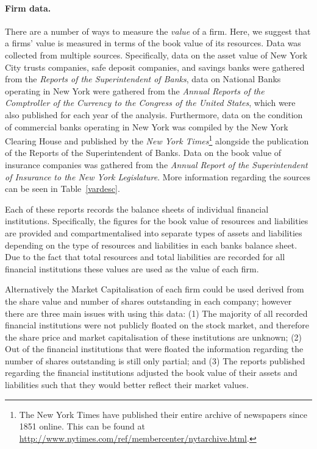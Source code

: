 \paragraph{Firm data.}

There are a number of ways to measure the \emph{value} of a firm. Here, we suggest that a firms' value is measured in terms of the book value of its resources. Data was collected from multiple sources. Specifically, data on the asset value of New York City trusts companies, safe deposit companies, and savings banks were gathered from the \emph{Reports of the Superintendent of Banks}, data on National Banks operating in New York were gathered from the \emph{Annual Reports of the Comptroller of the Currency to the Congress of the United States}, which were also published for each year of the analysis. Furthermore, data on the condition of commercial banks operating in New York was compiled by the New York Clearing House and published by the \emph{New York Times}\footnote{The New York Times have published their entire archive of newspapers since 1851 online. This can be found at \href{http://www.nytimes.com/ref/membercenter/nytarchive.html}{http://www.nytimes.com/ref/membercenter/nytarchive.html}.} alongside the publication of the Reports of the Superintendent of Banks. Data on the book value of insurance companies was gathered from the \emph{Annual Report of the Superintendent of Insurance to the New York Legislature}. More information regarding the sources can be seen in Table~\ref{vardesc}.

Each of these reports records the balance sheets of individual financial institutions. Specifically, the figures for the book value of resources and liabilities are provided and compartmentalised into separate types of assets and liabilities depending on the type of resources and liabilities in each banks balance sheet. Due to the fact that total resources and total liabilities are recorded for all financial institutions these values are used as the value of each firm.

Alternatively the Market Capitalisation of each firm could be used derived from the share value and number of shares outstanding in each company; however there are three main issues with using this data: (1) The majority of all recorded financial institutions were not publicly floated on the stock market, and therefore the share price and market capitalisation of these institutions are unknown; (2) Out of the financial institutions that were floated the information regarding the number of shares outstanding is still only partial; and (3) The reports published regarding the financial institutions adjusted the book value of their assets and liabilities such that they would better reflect their market values.

